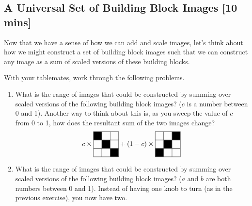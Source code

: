 \subsection{A Universal Set of Building Block Images [10 mins]}

Now that we have a sense of how we can add and scale images, let's think about how we might construct a set of building block images such that we can construct any image as a sum of scaled versions of these building blocks.

\begin{prob}
With your tablemates, work through the following problems.
\begin{enumerate}
\item What is the range of images that could be constructed by summing over scaled versions of the following building block images? ($c$ is a number between 0 and 1).  Another way to think about this is, as you sweep the value of $c$ from 0 to 1, how does the resultant sum of the two images change?
 \begin{align}
c \times \begin{tabular}{|c|c|c|}
\hline
\cellcolor{black}& & \\
\hline
& \cellcolor{black} & \\
\hline
& & \cellcolor{black} \\
\hline
\end{tabular} + (1-c) \times \begin{tabular}{|c|c|c|}
\hline
 & &\cellcolor{black} \\
\hline
& \cellcolor{black} & \\
\hline
 \cellcolor{black} & & \\
\hline
\end{tabular}\nonumber
\end{align}
\item What is the range of images that could be constructed by summing over scaled versions of the following building block images? ($a$ and $b$ are both numbers between 0 and 1).  Instead of having one knob to turn (as in the previous exercise), you now have two.


\end{enumerate}
\end{prob}
